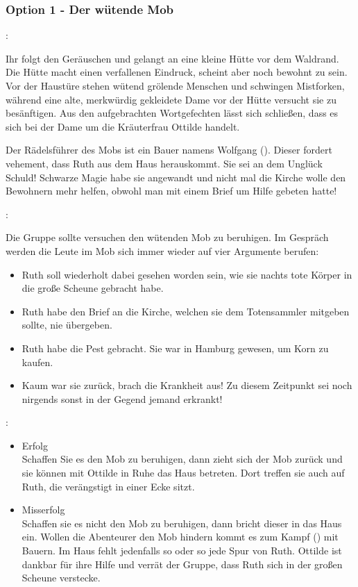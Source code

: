 \subsubsection*{Option 1 - Der wütende Mob}
\label{mob}

:

Ihr folgt den Geräuschen und gelangt an eine kleine Hütte vor dem Waldrand. Die Hütte macht einen verfallenen Eindruck, scheint aber noch bewohnt zu sein. Vor der Haustüre stehen wütend grölende Menschen und schwingen Mistforken, während eine alte, merkwürdig gekleidete Dame vor der Hütte versucht sie zu besänftigen.
Aus den aufgebrachten Wortgefechten lässt sich schließen, dass es sich bei der Dame um die Kräuterfrau Ottilde handelt.

Der Rädelsführer des Mobs ist ein Bauer namens Wolfgang (\blue{\ref{Wolfgang}}). Dieser fordert vehement, dass Ruth aus dem Haus herauskommt. Sie sei an dem Unglück Schuld! Schwarze Magie habe sie angewandt und nicht mal die Kirche wolle den Bewohnern mehr helfen, obwohl man mit einem Brief um Hilfe gebeten hatte!

:

Die Gruppe sollte versuchen den wütenden Mob zu beruhigen. Im Gespräch werden die Leute im Mob sich immer wieder auf vier Argumente berufen:

\begin{itemize}
  \item Ruth soll wiederholt dabei gesehen worden sein, wie sie nachts tote Körper in die große Scheune gebracht habe.
  \item Ruth habe den Brief an die Kirche, welchen sie dem Totensammler mitgeben sollte, nie übergeben.
  \item Ruth habe die Pest gebracht. Sie war in Hamburg gewesen, um Korn zu kaufen.
  \item Kaum war sie zurück, brach die Krankheit aus! Zu diesem Zeitpunkt sei noch nirgends sonst in der Gegend jemand erkrankt!
\end{itemize}

:

\begin{itemize}
  \item Erfolg \\
  Schaffen Sie es den Mob zu beruhigen, dann zieht sich der Mob zurück und sie können mit Ottilde in Ruhe das Haus betreten. Dort treffen sie auch auf Ruth, die verängstigt in einer Ecke sitzt.
  \item Misserfolg \\
  Schaffen sie es nicht den Mob zu beruhigen, dann bricht dieser in das Haus ein. Wollen die Abenteurer den Mob hindern kommt es zum Kampf (\blue{\ref{kampf}}) mit Bauern. Im Haus fehlt jedenfalls so oder so jede Spur von Ruth. Ottilde ist dankbar für ihre Hilfe und verrät der Gruppe, dass Ruth sich in der großen Scheune verstecke.
\end{itemize}

